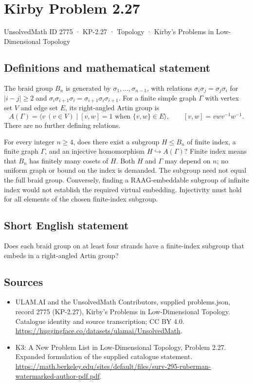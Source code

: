 \documentclass[11pt,a4paper]{article}
\begin{document}
\section*{Kirby Problem 2.27}\label{2775}
{\small UnsolvedMath ID 2775 · KP-2.27 · Topology · Kirby's Problems in Low-Dimensional Topology}
\subsection{Definitions and mathematical statement}
The braid group $B_n$ is generated by $\sigma_1,\ldots,\sigma_{n-1}$, with
relations $\sigma_i\sigma_j=\sigma_j\sigma_i$ for $|i-j|\geq2$ and
$\sigma_i\sigma_{i+1}\sigma_i=\sigma_{i+1}\sigma_i\sigma_{i+1}$.
For a finite simple graph $\Gamma$ with vertex set $V$ and edge set $E$, its
right-angled Artin group is
\[
A(\Gamma)=\langle v\ (v\in V)\mid [v,w]=1\text{ when }\{v,w\}\in E\rangle,
\qquad [v,w]=vwv^{-1}w^{-1}.
\]
There are no further defining relations.

For every integer $n\geq4$, does there exist a subgroup $H\leq B_n$ of finite
index, a finite graph $\Gamma$, and an injective homomorphism
$H\hookrightarrow A(\Gamma)$? Finite index means that $B_n$ has finitely many
cosets of $H$. Both $H$ and $\Gamma$ may depend on $n$; no uniform graph or
bound on the index is demanded.
The subgroup need not equal the full braid group. Conversely, finding a
RAAG-embeddable subgroup of infinite index would not establish the required
virtual embedding. Injectivity must hold for all elements of the chosen
finite-index subgroup.
\subsection{Short English statement}
Does each braid group on at least four strands have a finite-index subgroup that embeds in a right-angled Artin group?
\subsection{Sources}
\begin{itemize}
\item[S1] ULAM.AI and the UnsolvedMath Contributors, supplied problems.json, record 2775 (KP-2.27), Kirby's Problems in Low-Dimensional Topology. Catalogue identity and source transcription; CC BY 4.0.
\url{https://huggingface.co/datasets/ulamai/UnsolvedMath}.
\item[S2] K3: A New Problem List in Low-Dimensional Topology, Problem 2.27. Expanded formulation of the supplied catalogue statement.
\url{https://math.berkeley.edu/sites/default/files/surv-295-ruberman-watermarked-author-pdf.pdf}.
\end{itemize}
\end{document}
